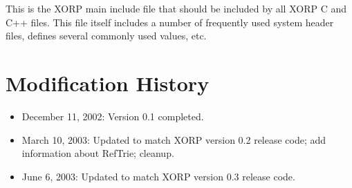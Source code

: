 \documentclass[11pt]{article}
\begin{document}
This is the XORP main include file that should be included by all XORP
C and C++ files. This file itself includes a number of frequently used system
header files, defines several commonly used values, etc.

 
\appendix
\section{Modification History}

\begin{itemize}

  \item December 11, 2002: Version 0.1 completed.

  \item March 10, 2003: Updated to match XORP version 0.2 release code;
  add information about RefTrie; cleanup.

  \item June 6, 2003: Updated to match XORP version 0.3 release code.

\end{itemize}




\end{document}

